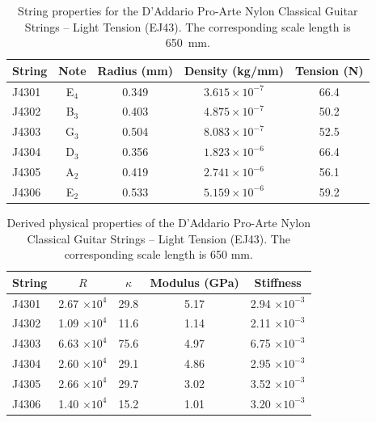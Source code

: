  \begin{table}[htbp]
  \centering
  \caption{\label{tbl:ej43_mks} String properties for the D'Addario Pro-Arte Nylon Classical Guitar Strings -- Light Tension (EJ43). The corresponding scale length is 650~mm.}
    \begin{tabular}{lcccc}
    \hline \hline
    String  & Note  & \multicolumn{1}{l}{Radius (mm)} & \multicolumn{1}{l}{Density (kg/mm)} & \multicolumn{1}{l}{Tension (N)} \\
    \hline
    J4301 & E$_4$  & 0.349 & $3.615 \times 10^{-7}$ & 66.4 \\
    J4302 & B$_3$  & 0.403 & $4.875 \times 10^{-7}$ & 50.2 \\
    J4303 & G$_3$  & 0.504 & $8.083 \times 10^{-7}$ & 52.5 \\
    J4304 & D$_3$  & 0.356 & $1.823 \times 10^{-6}$ & 66.4 \\
    J4305 & A$_2$  & 0.419 & $2.741 \times 10^{-6}$ & 56.1 \\
    J4306 & E$_2$  & 0.533 & $5.159 \times 10^{-6}$ & 59.2 \\
    \hline
    \end{tabular}%
 \end{table}%

 \begin{table}[htbp]
  \centering
  \caption{\label{tbl:ej43_props} Derived physical properties of the D'Addario Pro-Arte Nylon Classical Guitar Strings -- Light Tension (EJ43). The corresponding scale length is 650 mm.}
    \begin{tabular}{lcccc}
    \hline \hline
    String  & $R$ & $\kappa$ & Modulus (GPa) & Stiffness \\
    \hline
    J4301 & 2.67 $\times 10^{4}$ & 29.8 & 5.17 & 2.94 $\times 10^{-3}$ \\
    J4302 & 1.09 $\times 10^{4}$ & 11.6 & 1.14 & 2.11 $\times 10^{-3}$ \\
    J4303 & 6.63 $\times 10^{4}$ & 75.6 & 4.97 & 6.75 $\times 10^{-3}$ \\
    J4304 & 2.60 $\times 10^{4}$ & 29.1 & 4.86 & 2.95 $\times 10^{-3}$ \\
    J4305 & 2.66 $\times 10^{4}$ & 29.7 & 3.02 & 3.52 $\times 10^{-3}$ \\
    J4306 & 1.40 $\times 10^{4}$ & 15.2 & 1.01 & 3.20 $\times 10^{-3}$ \\
    \hline
    \end{tabular}%
 \end{table}%

